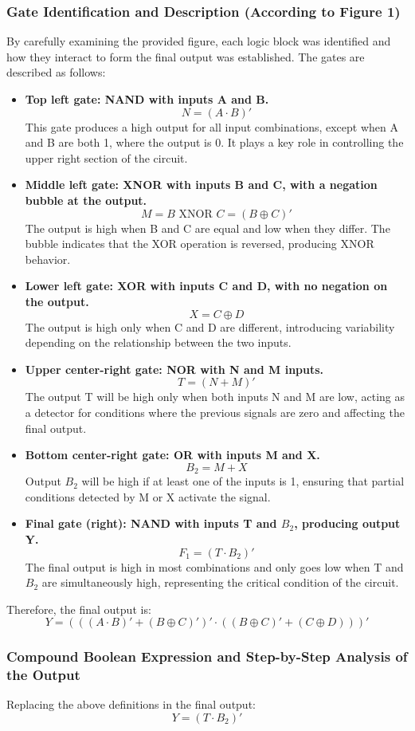 \documentclass[12pt]{article}  %
\begin{document}
\subsubsection{Gate Identification and Description (According to Figure 1)}
By carefully examining the provided figure, each logic block was identified and how they interact to form the final output was established. The gates are described as follows:
\begin{itemize}
    \item \textbf{Top left gate: NAND with inputs A and B.}
    $$N = (A \cdot B)'$$
    This gate produces a high output for all input combinations, except when A and B are both 1, where the output is 0. It plays a key role in controlling the upper right section of the circuit.
    \item \textbf{Middle left gate: XNOR with inputs B and C, with a negation bubble at the output.}
    $$M = B \text{ XNOR } C = (B \oplus C)'$$
    The output is high when B and C are equal and low when they differ. The bubble indicates that the XOR operation is reversed, producing XNOR behavior.
    \item \textbf{Lower left gate: XOR with inputs C and D, with no negation on the output.}
    $$X = C \oplus D$$
    The output is high only when C and D are different, introducing variability depending on the relationship between the two inputs.
    \item \textbf{Upper center-right gate: NOR with N and M inputs.}
    $$T = (N + M)'$$
    The output T will be high only when both inputs N and M are low, acting as a detector for conditions where the previous signals are zero and affecting the final output.
    \item \textbf{Bottom center-right gate: OR with inputs M and X.}
    $$B_2 = M + X$$
    Output $B_2$ will be high if at least one of the inputs is 1, ensuring that partial conditions detected by M or X activate the signal.
    \item \textbf{Final gate (right): NAND with inputs T and $B_2$, producing output Y.}
    $$F_1 = (T \cdot B_2)'$$
    The final output is high in most combinations and only goes low when T and $B_2$ are simultaneously high, representing the critical condition of the circuit.
\end{itemize}
Therefore, the final output is:
$$Y = (((A \cdot B)' + (B \oplus C)')' \cdot ((B \oplus C)' + (C \oplus D)))'$$

\subsubsection{Compound Boolean Expression and Step-by-Step Analysis of the Output}
Replacing the above definitions in the final output:
$$Y = (T \cdot B_2)'$$
\end{document}
